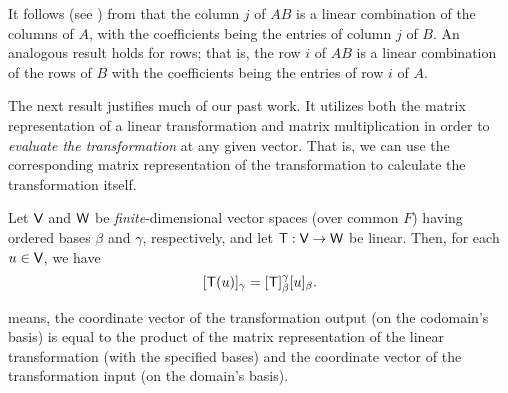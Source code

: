 \begin{remark} \label{remark 2.3.6}
It follows (see ) from  that the column \(j\) of \(AB\) is a linear combination of the columns of \(A\), with the coefficients being the entries of column \(j\) of \(B\).
An analogous result holds for rows; that is, the row \(i\) of \(AB\) is a linear combination of the rows of \(B\) with
the coefficients being the entries of row \(i\) of \(A\).
\end{remark}

The next result justifies much of our past work.
It utilizes both the matrix representation of a linear transformation and matrix multiplication in order
to \emph{evaluate the transformation} at any given vector.
That is, we can use the corresponding matrix representation of the transformation to calculate the transformation itself.

\begin{theorem} \label{thm 2.14}
Let \(\textsf{V}\) and \(\textsf{W}\) be \emph{finite}-dimensional vector spaces (over common \(F\)) having ordered bases \(\beta\) and \(\gamma\), respectively, and let \(\textsf{T} : \textsf{V} \to \textsf{W}\) be linear.
Then, for each \(u \in \textsf{V}\), we have
\[
    [\textsf{T}(u)]_{\gamma} = [\textsf{T}]_{\beta}^{\gamma}[u]_{\beta}.
\]
\end{theorem}

\begin{note}
 means, the coordinate vector of the transformation output (on the codomain's basis) is equal to the product of the matrix representation of the linear transformation (with the specified bases) and the coordinate vector of the transformation input (on the domain's basis).
\end{note}

